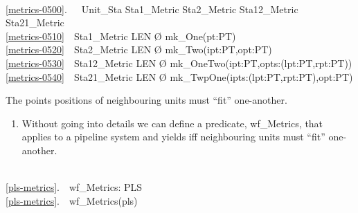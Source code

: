\mnewfoil\normalsize\HHHH
\bp
{}\\
\ref{metrics-0500}.\ \ \ Unit\_Sta {\EQ} Sta1\_Metric {\BAR} Sta2\_Metric {\BAR} Sta12\_Metric {\BAR} Sta21\_Metric\ \ \\
\ref{metrics-0510}\ \ Sta1\_Metric {\EQ} LEN {\TIMES} {\O} {\TIMES} mk\_One(pt:PT) \\
\ref{metrics-0520}\ \ Sta2\_Metric {\EQ} LEN {\TIMES} {\O} {\TIMES} mk\_Two(ipt:PT,opt:PT) \\
\ref{metrics-0530}\ \ Sta12\_Metric {\EQ} LEN {\TIMES} {\O} {\TIMES} mk\_OneTwo(ipt:PT,opts:(lpt:PT,rpt:PT)) \\
\ref{metrics-0540}\ \ Sta21\_Metric {\EQ} LEN {\TIMES} {\O} {\TIMES} mk\_TwpOne(ipts:(lpt:PT,rpt:PT),opt:PT) 
\ep


\label{pipe:Wellformed Unit Metrics}

\begynd
\pind The points positions of neighbouring units must ``fit'' one-another.
\afslut

\begin{enumerate}\setei
\item \label{pls-metrics} Without going into details we can define a predicate,
      \textsf{wf\_Metrics}, \nyl that applies to a pipeline system and
      yields  \nyl iff neighbouring units must ``fit'' one-another.
\savei\end{enumerate}
    
\bp
{}\\
\ref{pls-metrics}.\ \ wf\_Metrics: PLS {\RIGHTARROW} \\
\ref{pls-metrics}.\ \ wf\_Metrics(pls) {\IS} {\DOTDOTDOT} 
\ep

